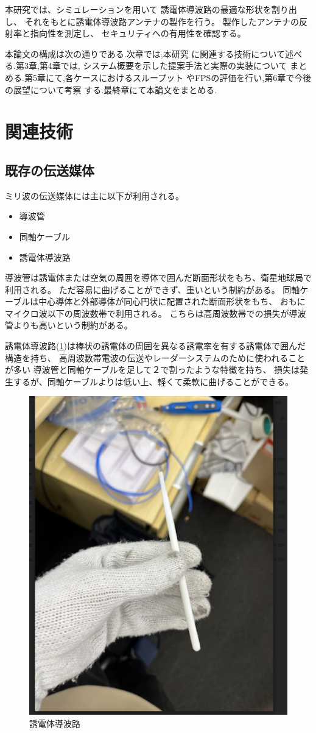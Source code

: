 \documentclass[technicalreport]{ieicej}
\begin{document}
本研究では、シミュレーションを用いて
誘電体導波路の最適な形状を割り出し、
それをもとに誘電体導波路アンテナの製作を行う。
製作したアンテナの反射率と指向性を測定し、
セキュリティへの有用性を確認する。

本論文の構成は次の通りである.次章では,本研究
に関連する技術について述べる.第3章,第4章では,
システム概要を示した提案手法と実際の実装について
まとめる.第5章にて,各ケースにおけるスループット
やFPSの評価を行い,第6章で今後の展望について考察
する.最終章にて本論文をまとめる.

\section{関連技術}

\subsection{既存の伝送媒体}

ミリ波の伝送媒体には主に以下が利用される。
\begin{itemize}
  \item 導波管
  \item 同軸ケーブル
  \item 誘電体導波路
\end{itemize}

導波管は誘電体または空気の周囲を導体で囲んだ断面形状をもち、衛星地球局で利用される。
ただ容易に曲げることができず、重いという制約がある。
同軸ケーブルは中心導体と外部導体が同心円状に配置された断面形状をもち、
おもにマイクロ波以下の周波数帯で利用される。
こちらは高周波数帯での損失が導波管よりも高いという制約がある。

誘電体導波路(\ref{fig:dielectric_waveguide})は棒状の誘電体の周囲を異なる誘電率を有する誘電体で囲んだ構造を持ち、
高周波数帯電波の伝送やレーダーシステム\cite{4297420}のために使われることが多い
導波管と同軸ケーブルを足して２で割ったような特徴を持ち、
損失は発生するが、同軸ケーブルよりは低い上、軽くて柔軟に曲げることができる。


\begin{figure}[tb]
  \begin{center}
    \includegraphics[bb=0 0 311 384, width=0.5\linewidth]{img/waveguide.pdf}
    \caption{誘電体導波路}
    \label{fig:dielectric_waveguide}
  \end{center}
\end{figure}
\end{document}
